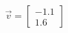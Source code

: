 \documentclass[preview]{standalone}
\begin{document}
\begin{align*}
\vec{v}=\begin{bmatrix}-1.1\\1.6\end{bmatrix}
\end{align*}
\end{document}
